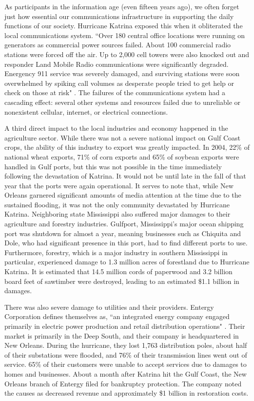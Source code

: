 \documentclass[%
 reprint,
 amsmath,amssymb,
 aps,
]{revtex4-1}
\begin{document}
As participants in the information age (even fifteen years ago), we often forget just how essential our communications infrastructure in supporting the daily functions of our society. Hurricane Katrina exposed this when it obliterated the local communications system. ``Over 180 central office locations were running on generators as commercial power sources failed. About 100 commercial radio stations were forced off the air. Up to 2,000 cell towers were also knocked out and responder Land Mobile Radio communications were significantly degraded. Energency 911 service was severely damaged, and surviving stations were soon overwhelmed by spiking call volumes as desperate people tried to get help or check on those at risk" \cite{MillerPaper}. The failures of the communications system had a cascading effect: several other systems and resources failed due to unreliable or nonexistent cellular, internet, or electrical connections.

A third direct impact to the local industries and economy happened in the agriculture sector. While there was not a severe national impact on Gulf Coast crops, the ability of this industry to export was greatly impacted. In 2004, 22\% of national wheat exports, 71\% of corn exports and 65\% of soybean exports were handled in Gulf ports, but this was not possible in the time immediately following the devastation of Katrina. It would not be until late in the fall of that year that the ports were again operational. \cite{samuelson_2005} It serves to note that, while New Orleans garnered significant amounts of media attention at the time due to the sustained flooding, it was not the only community devastated by Hurricane Katrina. Neighboring state Mississippi also suffered major damages to their agriculture and forestry industries. Gulfport, Mississippi's major ocean shipping port was shutdown for almost a year, meaning businesses such as Chiquita and Dole, who had significant presence in this port, had to find different ports to use. Furthermore, forestry, which is a major industry in southern Mississippi in particular, experienced damage to 1.3 million acres of forestland due to Hurricane Katrina. It is estimated that 14.5 million cords of paperwood and 3.2 billion board feet of sawtimber were destroyed, leading to an estimated \$1.1 billion in damages. \cite{grizzard_2005}

There was also severe damage to utilities and their providers. Entergy Corporation defines themselves as, ``an integrated energy company engaged primarily in electric power production and retail distribution operations" \cite{entergy}. Their market is primarily in the Deep South, and their company is headquartered in New Orleans. During the hurricane, they lost 1,763 distribution poles, about half of their substations were flooded, and 76\% of their transmission lines went out of service. 65\% of their customers were unable to accept services due to damages to homes and businesses. About a month after Katrina hit the Gulf Coast, the New Orleans branch of Entergy filed for bankruptcy protection. The company noted the causes as decreased revenue and approximately \$1 billion in restoration costs. \cite{walton_2015}
\end{document}
